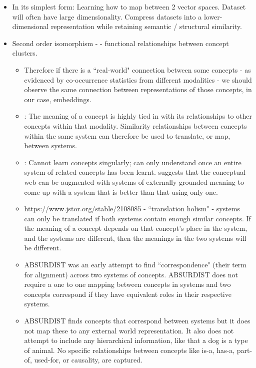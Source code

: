     \begin{itemize}
        \item In its simplest form: Learning how to map between 2 vector spaces. Dataset will often have large dimensionality. Compress datasets into a lower-dimensional representation while retaining semantic / structural similarity. 
        \item Second order isomorphism - \cite{SHEPARD19701} - functional relationships between concept clusters. 
        \begin{itemize}
            \item Therefore if there is a ``real-world" connection between some concepts - as evidenced by co-occurrence statistics from different modalities - we should observe the same connection between representations of those concepts, in our case, embeddings. 
            \item \cite{GOLDSTONE2002295}: The meaning of a concept is highly tied in with its relationships to other concepts within that modality. Similarity relationships between concepts within the same system can therefore be used to translate, or map, between systems. 
            \item \cite{GOLDSTONE2002295}: Cannot learn concepts singularly; can only understand once an entire system of related concepts has been learnt. \cite{GOLDSTONE2002295} suggests that the conceptual web can be augmented with systems of externally grounded meaning to come up with a system that is better than that using only one. 
            \item https://www.jstor.org/stable/2108085 - ``translation holism" - systems can only be translated if both systems contain enough similar concepts. If the meaning of a concept depends on that concept's place in the system, and the systems are different, then the meanings in the two systems will be different. 
            \item \cite{GOLDSTONE2002295} ABSURDIST was an early attempt to find ``correspondence" (their term for alignment) across two systems of concepts. ABSURDIST does not require a one to one mapping between concepts in systems and two concepts correspond if they have equivalent roles in their respective systems.
            \item ABSURDIST finds concepts that correspond between systems but it does not map these to any external world representation. It also does not attempt to include any hierarchical information, like that a dog is a type of animal. No specific relationships between concepts like is-a, has-a, part-of, used-for, or causality, are captured. 

\end{itemize}
\end{itemize}
